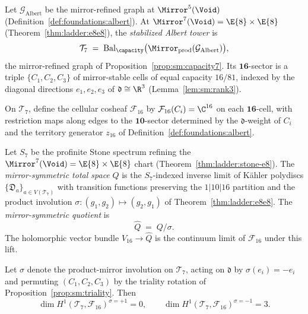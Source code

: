 \begin{definition}\label{def:appendix:tower7}
Let $\mathcal{G}_{\mathrm{Albert}}$ be the mirror-refined graph at
$\Mirror^5(\Void)$ (Definition~\ref{def:foundations:albert}). At
$\Mirror^7(\Void)=\E{8}\times\E{8}$ (Theorem~\ref{thm:ladder:e8e8}), the
\emph{stabilized Albert tower} is
\begin{equation}\label{eq:appendix:tower7}
  \mathcal{T}_7
  \;=\;
  \mathrm{Bal}_\capacity\bigl(\Mirror_{\mathrm{prod}}(\mathcal{G}_{\mathrm{Albert}})\bigr),
\end{equation}
the mirror-refined graph of Proposition~\ref{prop:sm:capacity7}. Its
$\mathbf{16}$-sector is a triple $\{C_1,C_2,C_3\}$ of mirror-stable cells of
equal capacity $16/81$, indexed by the diagonal directions
$e_1,e_2,e_3$ of $\mathfrak{d}\cong\R^3$
(Lemma~\ref{lem:sm:rank3}).
\end{definition}

\begin{definition}\label{def:appendix:F16}
On $\mathcal{T}_7$, define the cellular cosheaf $\mathcal{F}_{16}$ by
$\mathcal{F}_{16}(C_i)=\C^{16}$ on each $\mathbf{16}$-cell, with restriction
maps along edges to the $\mathbf{10}$-sector determined by the
$\mathfrak{d}$-weight of $C_i$ and the territory generator $z_{16}$ of
Definition~\ref{def:foundations:albert}.
\end{definition}

\begin{definition}\label{def:appendix:Qhat}
Let $S_7$ be the profinite Stone spectrum refining the
$\Mirror^7(\Void)=\E{8}\times\E{8}$ chart (Theorem~\ref{thm:ladder:stone-e8}).
The \emph{mirror-symmetric total space} $Q$ is the $S_7$-indexed inverse limit of
K\"ahler polydiscs $\{\mathfrak{D}_a\}_{a\in V(\mathcal{T}_7)}$ with
transition functions preserving the $1|10|16$ partition and the product
involution $\sigma:(g_1,g_2)\mapsto(g_2,g_1)$ of
Theorem~\ref{thm:ladder:e8e8}. The \emph{mirror-symmetric quotient} is
\begin{equation}\label{eq:appendix:Qhat}
  \hat Q \;=\; Q/\sigma.
\end{equation}
The holomorphic vector bundle $V_{16}\to\hat Q$ is the continuum limit of
$\mathcal{F}_{16}$ under this lift.
\end{definition}

\begin{lemma}\label{lem:appendix:cellular}
Let $\sigma$ denote the product-mirror involution on $\mathcal{T}_7$, acting on
$\mathfrak{d}$ by $\sigma(e_i)=-e_i$ and permuting $(C_1,C_2,C_3)$ by the
triality rotation of Proposition~\ref{prop:sm:triality}. Then
\begin{equation}\label{eq:appendix:cellH1}
  \dim H^1(\mathcal{T}_7,\mathcal{F}_{16})^{\sigma=+1}=0,
  \qquad
  \dim H^1(\mathcal{T}_7,\mathcal{F}_{16})^{\sigma=-1}=3.
\end{equation}
\end{lemma}

